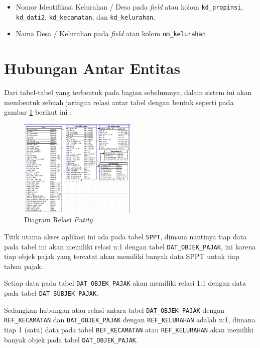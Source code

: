 \begin{itemize}
	\item Nomor Identifikasi Kelurahan / Desa pada \textit{field} atau kolom \texttt{kd\_propinsi}, \texttt{kd\_dati2}, \texttt{kd\_kecamatan}, dan \texttt{kd\_kelurahan}.
	\item Nama Desa / Kelurahan pada \textit{field} atau kolom \texttt{nm\_kelurahan}
\end{itemize}

\section{Hubungan Antar Entitas}

Dari tabel-tabel yang terbentuk pada bagian sebelumnya, dalam sistem ini akan membentuk sebuah jaringan relasi antar tabel dengan bentuk seperti pada gambar \ref{fig:db-diagram} berikut ini :

\begin{figure}[H]
	\centering
	\includegraphics[width=0.5\textwidth]{./resources/db-diagram}
	\caption{Diagram Relasi \textit{Entity}}
	\label{fig:db-diagram}
\end{figure}

Titik utama akses aplikasi ini ada pada tabel \texttt{SPPT}, dimana nantinya tiap data pada tabel ini akan memiliki relasi n:1 dengan tabel \texttt{DAT\_OBJEK\_PAJAK}, ini karena tiap objek pajak yang tercatat akan memiliki banyak data SPPT untuk tiap tahun pajak.

Setiap data pada tabel \texttt{DAT\_OBJEK\_PAJAK} akan memiliki relasi 1:1 dengan data pada tabel \texttt{DAT\_SUBJEK\_PAJAK}. 

Sedangkan hubungan atau relasi antara tabel \texttt{DAT\_OBJEK\_PAJAK} dengan \texttt{REF\_KECAMATAN} dan \texttt{DAT\_OBJEK\_PAJAK} dengan \texttt{REF\_KELURAHAN} adalah n:1, dimana tiap 1 (satu) data pada tabel \texttt{REF\_KECAMATAN} atau \texttt{REF\_KELURAHAN} akan memiliki banyak objek pada tabel \texttt{DAT\_OBJEK\_PAJAK}.